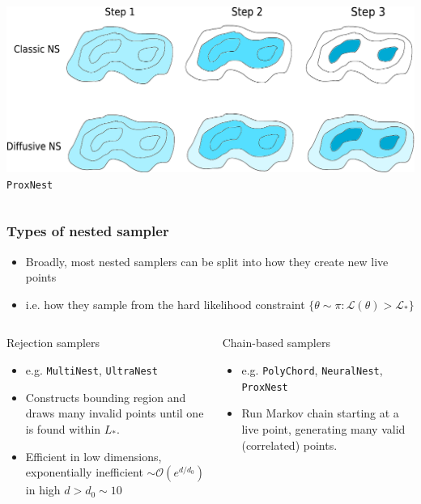\documentclass[aspectratio=169,handout]{beamer}
\begin{document}
\begin{frame}
\begin{columns}[t]
        \includegraphics[width=\textwidth]{figures/dnest}
        \texttt{ProxNest}~
        \vfill
    \end{columns}
\end{frame}



\begin{frame}
    \frametitle{Types of nested sampler}
    \begin{itemize}
        \item Broadly, most nested samplers can be split into how they create new live points
        \item i.e. how they sample from the hard likelihood constraint $\{\theta\sim \pi : \mathcal{L}(\theta)>\mathcal{L}_* \}$
    \end{itemize}
    \vspace{-10pt}
    \begin{columns}[t]
        \begin{block}{Rejection samplers}
            \begin{itemize}
                \item e.g. \texttt{MultiNest}, \texttt{UltraNest}
                \item Constructs bounding region and draws many invalid points until one is found within $L_*$.
                \item Efficient in low dimensions, exponentially inefficient $\sim\mathcal{O}(e^{d/d_0})$ in high  $d>d_0\sim10$
            \end{itemize}
        \end{block}
        \begin{block}{Chain-based samplers}
            \begin{itemize}
                \item e.g. \texttt{PolyChord}, \texttt{NeuralNest}, \texttt{ProxNest}
                \item Run Markov chain starting at a live point, generating many valid (correlated) points.

\end{itemize}
\end{block}
\end{columns}
\end{frame}
\end{document}
